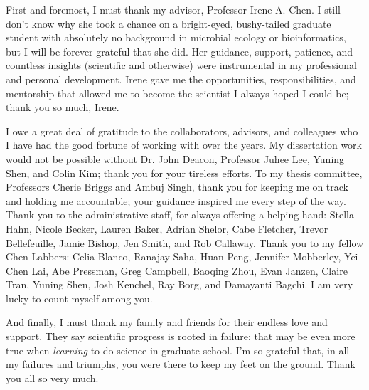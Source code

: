 \begin{acknowledgements}

First and foremost, I must thank my advisor, Professor Irene A. Chen. I still don't know why she took a chance on a bright-eyed, bushy-tailed graduate student with absolutely no background in microbial ecology or bioinformatics, but I will be forever grateful that she did. Her guidance, support, patience, and countless insights (scientific and otherwise) were instrumental in my professional and personal development. Irene gave me the opportunities, responsibilities, and mentorship that allowed me to become the scientist I always hoped I could be; thank you so much, Irene.

I owe a great deal of gratitude to the collaborators, advisors, and colleagues who I have had the good fortune of working with over the years. My dissertation work would not be possible without Dr. John Deacon, Professor Juhee Lee, Yuning Shen, and Colin Kim; thank you for your tireless efforts. To my thesis committee, Professors Cherie Briggs and Ambuj Singh, thank you for keeping me on track and holding me accountable; your guidance inspired me every step of the way. Thank you to the administrative staff, for always offering a helping hand: Stella Hahn, Nicole Becker, Lauren Baker, Adrian Shelor, Cabe Fletcher, Trevor Bellefeuille, Jamie Bishop, Jen Smith, and Rob Callaway. Thank you to my fellow Chen Labbers: Celia Blanco, Ranajay Saha, Huan Peng, Jennifer Mobberley, Yei-Chen Lai, Abe Pressman, Greg Campbell, Baoqing Zhou, Evan Janzen, Claire Tran, Yuning Shen, Josh Kenchel, Ray Borg, and Damayanti Bagchi. I am very lucky to count myself among you.

And finally, I must thank my family and friends for their endless love and support. They say scientific progress is rooted in failure; that may be even more true when \textit{learning} to do science in graduate school. I'm so grateful that, in all my failures and triumphs, you were there to keep my feet on the ground. Thank you all so very much.

\end{acknowledgements} 
